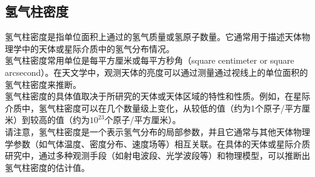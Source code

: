 \documentclass[12pt, a4paper, oneside]{ctexart}
\begin{document}
\begin{spacing}{2.0}
\section{氢气柱密度}

氢气柱密度是指单位面积上通过的氢气质量或氢原子数量。它通常用于描述天体物理学中的天体或星际介质中的氢气分布情况。
\\
氢气柱密度常用单位是每平方厘米或每平方秒角（square centimeter or square arcsecond）。在天文学中，观测天体的亮度可以通过测量通过视线上的单位面积的氢气柱密度来推断。
\\
氢气柱密度的具体值取决于所研究的天体或天体区域的特性和性质。例如，在星际介质中，氢气柱密度可以在几个数量级上变化，从较低的值（约为1个原子/平方厘米）到较高的值（约为$10^23$个原子/平方厘米）。
\\
请注意，氢气柱密度是一个表示氢气分布的局部参数，并且它通常与其他天体物理学参数（如气体温度、密度分布、速度场等）相互关联。在具体的天体或星际介质研究中，通过多种观测手段（如射电波段、光学波段等）和物理模型，可以推断出氢气柱密度的估计值。






\end{spacing}{}
\end{document}
